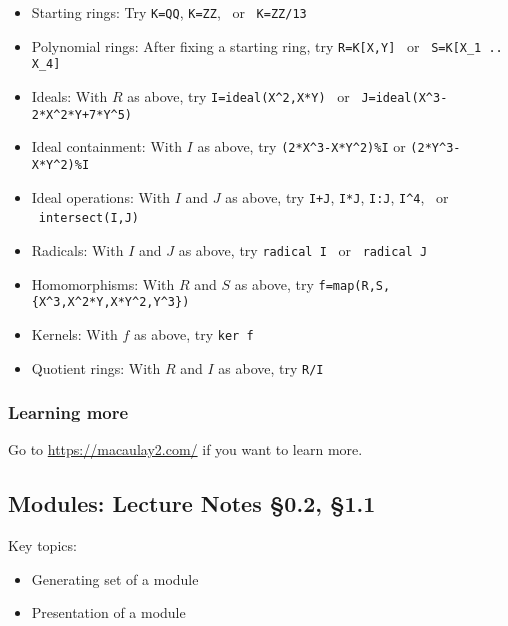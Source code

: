 \documentclass[12pt]{amsart}
\newcommand{\0}{$\phantom{.}$}
\newcommand{\1}{\mathbbm{1}}
\begin{document}
\begin{itemize}
\item Starting rings: Try \texttt{K=QQ}, \texttt{K=ZZ}, \ or \  \texttt{K=ZZ/13}
\item Polynomial rings: After fixing a starting ring, try \texttt{R=K[X,Y]} \ or \  {\verb|S=K[X_1 .. X_4]|}
\item Ideals: With $R$ as above, try \verb|I=ideal(X^2,X*Y)| \ or  \ \verb|J=ideal(X^3-2*X^2*Y+7*Y^5)|
\item Ideal containment: With $I$ as above, try \verb|(2*X^3-X*Y^2)%I| or \verb|(2*Y^3-X*Y^2)%I|
\item Ideal operations: With $I$ and $J$ as above, try \verb|I+J|, \verb|I*J|, \verb|I:J|, \verb|I^4|, \ or \ \verb|intersect(I,J)|
\item Radicals: With $I$ and $J$ as above, try \texttt{radical I} \ or \  \texttt{radical J}
\item Homomorphisms: With $R$ and $S$ as above, try \verb|f=map(R,S,{X^3,X^2*Y,X*Y^2,Y^3})|
\item Kernels: With $f$ as above, try \verb|ker f|
\item Quotient rings: With $R$ and $I$ as above, try \verb|R/I|
\end{itemize}


\subsubsection*{Learning more} Go to \url{https://macaulay2.com/} if you want to learn more.


\newpage








\subsection{Modules:  Lecture Notes \S0.2, \S1.1}


\begin{framed} Key topics:
\begin{itemize}
\item Generating set of a module
\item Presentation of a module
\end{itemize}
\end{framed}
\end{document}
